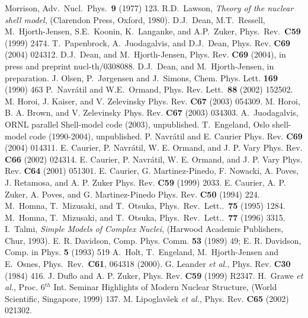 \documentclass{article}
\begin{document}
\begin{thebibliography}{200}
                  Morrison, Adv.\ Nucl.\ Phys.\ {\bf 9} (1977) 123.
 R.D.~Lawson, {\em Theory of the nuclear shell model},
(Clarendon Press, Oxford, 1980).
 D.J.\ Dean, M.T.\ Ressell, M.\ Hjorth-Jensen, S.E.\ Koonin, 
K.\ Langanke, and A.P.\ Zuker, Phys.\ Rev.\ {\bf C59} (1999) 2474.
 T.~Papenbrock, A.~Juodagalvis, and D.J.~Dean, 
Phys. Rev. {\bf C69} (2004) 024312.
 D.J.~Dean, and M.~Hjorth-Jensen, 
Phys. Rev. {\bf C69} (2004), in press and preprint nucl-th/0308088.
 D.J.~Dean, and M.~Hjorth-Jensen, in preparation.
 J. Olsen, P.~J{\o}rgensen and J.~Simons, Chem. Phys. Lett.
{\bf 169} (1990) 463
 P.~Navr\'atil and W.E.~Ormand, Phys. Rev. Lett.~{\bf 88} (2002) 152502.
   M. Horoi, J. Kaiser, and V. Zelevinsky
Phys. Rev. {\bf C67} (2003) 054309.
 M. Horoi, B. A. Brown, and V. Zelevinsky
Phys. Rev. {\bf C67} (2003) 034303.
 A.~Juodagalvis, ORNL parallel Shell-model code (2003), unpublished.
 T.~Engeland, Oslo shell-model code (1990-2004), unpublished.
P. Navr\'atil and E. Caurier
Phys. Rev. {\bf C69} (2004) 014311.
E. Caurier, P. Navr\'atil, W. E. Ormand, and J. P. Vary
Phys. Rev. {\bf C66} (2002) 024314.
E. Caurier, P. Navr\'atil, W. E. Ormand, and J. P. Vary
Phys. Rev. {\bf C64} (2001) 051301. 
E. Caurier, G. Martinez-Pinedo, F. Nowacki, A. Poves, J. Retamosa, and A. P. Zuker
Phys. Rev. {\bf C59} (1999) 2033. 
E. Caurier, A. P. Zuker, A. Poves, and G. Martinez-Pinedo
Phys. Rev. {\bf C50} (1994) 224. 
 M.~Homna, T.~Mizusaki, and T.~Otsuka,
Phys.~Rev.~Lett..~{\bf 75}  (1995) 1284.
 M.~Homna, T.~Mizusaki, and T.~Otsuka,
Phys.~Rev.~Lett..~{\bf 77}  (1996) 3315.
 I.~Talmi, {\em Simple Models of Complex Nuclei},
(Harwood Academic Publishers, Chur, 1993).
 E. R. Davidson, Comp. Phys. Comm. {\bf 53} (1989) 49;
                E. R. Davidson, Comp. in  Phys. {\bf 5} (1993) 519
 A.~Holt, T.~Engeland, M.~Hjorth-Jensen and E.~Osnes,
Phys.~Rev.~{\bf C61}, 064318 (2000).
 G. Leander {\it et al.}, Phys. Rev. {\bf C30} (1984) 416.
 J. Duflo and A. P. Zuker, Phys. Rev. {\bf C59}  (1999) R2347.
H.~Grawe {\em et al.}, Proc. 6$^{th}$ Int. Seminar Highlights of
Modern Nuclear Structure, (World Scientific, Singapore, 1999) 137.
M. Lipoglav\v{s}ek {\it et al.}, Phys. Rev. {\bf C65} (2002) 021302.

\end{thebibliography}
\end{document}
